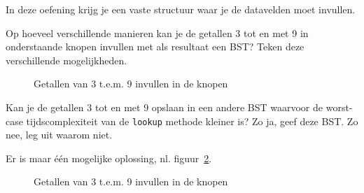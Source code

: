 \begin{oef}
\papier In deze oefening krijg je een vaste structuur waar je de datavelden moet invullen.
\begin{oefenumerate}
\item Op hoeveel verschillende manieren kan je de getallen 3 tot en met 9 in onderstaande knopen invullen met als resultaat een BST?  Teken deze verschillende mogelijkheden.
\begin{figure}[htbp]
    \centering
{}
\caption{Getallen van 3 t.e.m. 9 invullen in de knopen}
    \label{fig:oefBST39}
\end{figure}

\item Kan je de getallen 3 tot en met 9 opslaan in een andere BST waarvoor de worst-case tijdscomplexiteit van de \verb=lookup= methode kleiner is? Zo ja, geef deze BST. Zo nee, leg uit waarom niet.
\end{oefenumerate}


\begin{opl}
Er is maar één mogelijke oplossing, nl. figuur~\ref{fig:oefBST39opl}.
\begin{figure}[htbp]
    \centering
{}
\caption{Getallen van 3 t.e.m. 9 invullen in de knopen}
    \label{fig:oefBST39opl}
\end{figure}
\end{opl}
\end{oef}






